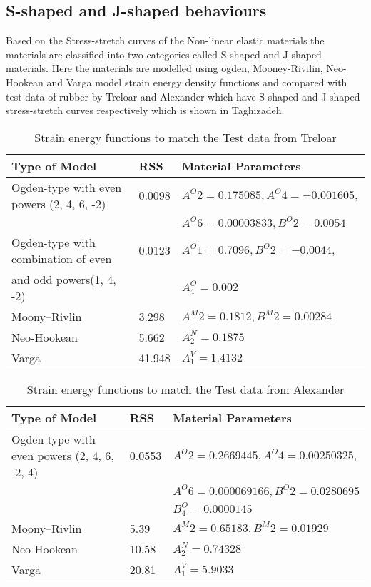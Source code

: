 \documentclass[12pt]{report}
\begin{document}
\subsection{S-shaped and J-shaped behaviours}
Based on the Stress-stretch curves of the Non-linear elastic materials the materials are classified into two categories called S-shaped and J-shaped materials. Here the materials are modelled using ogden, Mooney-Rivilin, Neo-Hookean and Varga model strain energy density functions and compared with test data of rubber by Treloar\cite{treloar} and Alexander\cite{alexander} which have S-shaped and J-shaped stress-stretch curves respectively which is shown in Taghizadeh\cite{snap}.

\begin{table}[h]
    \centering
    \begin{tabular}{|l|l|l|}
        \hline
         \textbf{Type of Model} & \textbf{RSS} & \textbf{Material Parameters}\\
         \hline
         Ogden-type with even powers (2, 4, 6, -2) & 0.0098 & $A^{O}{2}=0.175085, A^{O}{4}=-0.001605,$\\
          & & $A^{O}{6}=0.00003833, B^{O}{2}=0.0054$  \\
         \hline
         Ogden-type with combination of even & 0.0123& $A^{O}{1}=0.7096, B^{O}{2}=-0.0044,$\\
         and odd powers(1, 4, -2) & &  $A^{O}_{4}=0.002$\\
         \hline
         Moony–Rivlin & 3.298 & $A^{M}{2}=0.1812, B^{M}{2}=0.00284$\\
         \hline
         Neo-Hookean & 5.662 & $A^{N}_{2}=0.1875$\\
         \hline
         Varga & 41.948 & $A^{V}_{1}=1.4132$\\
         \hline
    \end{tabular}
    \caption{Strain energy functions to match the Test data from Treloar\cite{treloar}}
    \label{Table 1.1}
\end{table}
\vspace{-5mm}
\begin{table}[h]
    \centering
    \begin{tabular}{|l|l|l|}
        \hline
        \textbf{Type of Model} & \textbf{RSS} & \textbf{Material Parameters}\\
        \hline
        Ogden-type with even powers (2, 4, 6, -2,-4) & 0.0553 & $A^{O}{2}=0.2669445, A^{O}{4}=0.00250325,$\\
         & & $A^{O}{6}=0.000069166, B^{O}{2}=0.0280695$  \\
         & & $B^{O}_{4}=0.0000145$\\
        \hline
        Moony–Rivlin & 5.39 & $A^{M}{2}=0.65183, B^{M}{2}=0.01929$\\
        \hline
        Neo-Hookean & 10.58 & $A^{N}_{2}=0.74328$\\
        \hline
        Varga & 20.81 & $A^{V}_{1}=5.9033$\\
        \hline
    \end{tabular}
    \caption{Strain energy functions to match the Test data from Alexander\cite{alexander}}
    \label{Table 1.2}
\end{table}
\end{document}
